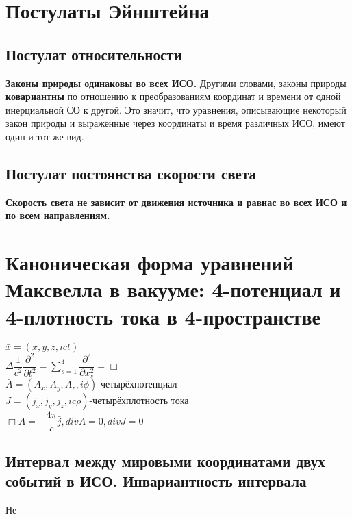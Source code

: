 \newcommand{\colontitulAutors}{edombek}
\newcommand{\colontitulYear}{2022}
\newcommand{\colontitulEducationalSubject}{СПЕЦИАЛЬНАЯ ТЕОРИЯ ОТНОСИТЕЛЬНОСТИ}
\newcommand{\colontitulTeacher}{И.~А.~Павличенко}




	\small
	\begin{multicols*}{2}
		\section{Постулаты Эйнштейна}
		\subsection{Постулат относительности}
		\textbf{Законы природы одинаковы во всех ИСО.} Другими словами, законы природы \textbf{ковариантны} по отношению к преобразованиям координат и времени от одной инерциальной СО к другой. Это значит, что уравнения, описывающие некоторый закон природы и выраженные через координаты и время различных ИСО, имеют один и тот же вид.
		\subsection{Постулат постоянства скорости света}
		\textbf{Скорость света не зависит от движения источника и равнас во всех ИСО и по всем направлениям.}
		
		\section{Каноническая форма уравнений Максвелла в вакууме: 4-потенциал и 4-плотность тока в 4-пространстве}
		$ \bar{x} = \left(x, y, z, ict\right) $ \\
		$ \Delta \dfrac{1}{c^2}\dfrac{\partial^2}{\partial t^2}=\sum\limits_{s=1}^4\dfrac{\partial^2}{\partial x_s^2}=\Box $  \\
		$ \bar{A} = \left(A_x, A_y, A_z, i\phi\right) \text{-четырёхпотенциал} $ \\ 
		$ \bar{J} = \left(j_x, j_y, j_z, ic\rho\right) \text{-четырёхплотность тока}  $ \\
		$ \Box \bar{A} = -\dfrac{4\pi}{c}\bar{j}, div{\bar{A}} = 0, div{\bar{J}} = 0  $
		
		\subsection*{Интервал между мировыми координатами двух событий в ИСО. Инвариантность интервала}
		Не

\end{multicols*}
